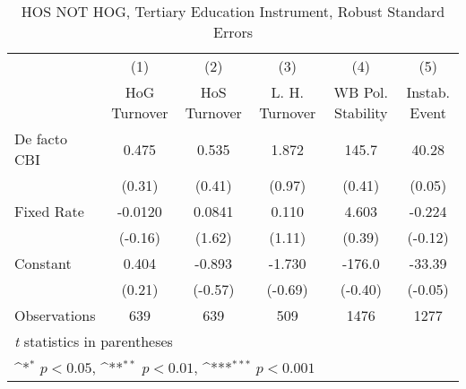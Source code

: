 \begin{table}[htbp]\centering
\def\sym#1{\ifmmode^{#1}\else\(^{#1}\)\fi}
\caption{HOS NOT HOG, Tertiary Education Instrument, Robust Standard Errors \label{NOhoshogIfivs2}}
\begin{tabular}{l*{5}{c}}
\toprule
                                        &\multicolumn{1}{c}{(1)}&\multicolumn{1}{c}{(2)}&\multicolumn{1}{c}{(3)}&\multicolumn{1}{c}{(4)}&\multicolumn{1}{c}{(5)}\\
                                        &\multicolumn{1}{c}{HoG Turnover}&\multicolumn{1}{c}{HoS Turnover}&\multicolumn{1}{c}{L. H. Turnover}&\multicolumn{1}{c}{WB Pol. Stability}&\multicolumn{1}{c}{Instab. Event}\\
\midrule
De facto CBI                            &    0.475         &    0.535         &    1.872         &    145.7         &    40.28         \\
                                        &   (0.31)         &   (0.41)         &   (0.97)         &   (0.41)         &   (0.05)         \\
\addlinespace
Fixed Rate                              &  -0.0120         &   0.0841         &    0.110         &    4.603         &   -0.224         \\
                                        &  (-0.16)         &   (1.62)         &   (1.11)         &   (0.39)         &  (-0.12)         \\
\addlinespace
Constant                                &    0.404         &   -0.893         &   -1.730         &   -176.0         &   -33.39         \\
                                        &   (0.21)         &  (-0.57)         &  (-0.69)         &  (-0.40)         &  (-0.05)         \\
\midrule
Observations                            &      639         &      639         &      509         &     1476         &     1277         \\
\bottomrule
\multicolumn{6}{l}{\footnotesize \textit{t} statistics in parentheses}\\
\multicolumn{6}{l}{\footnotesize \sym{*} \(p<0.05\), \sym{**} \(p<0.01\), \sym{***} \(p<0.001\)}\\
\end{tabular}
\end{table}
